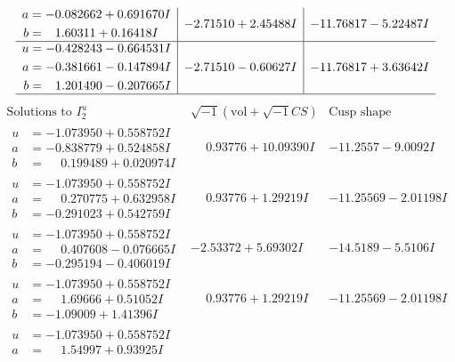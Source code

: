 \documentclass[1p]{elsarticle_modified}
\theoremstyle{definition}
\newcommand{\I}{\sqrt{-1}}
\begin{document}
$$\begin{array}{c|c|c}
\begin{aligned}
a &= -0.082662 + 0.691670 I \\
b &= \phantom{-}1.60311 + 0.16418 I\end{aligned}
 & -2.71510 + 2.45488 I & -11.76817 - 5.22487 I \\ \hline\begin{aligned}
u &= -0.428243 - 0.664531 I \\
a &= -0.381661 - 0.147894 I \\
b &= \phantom{-}1.201490 - 0.207665 I\end{aligned}
 & -2.71510 - 0.60627 I & -11.76817 + 3.63642 I\\
 \hline 
 \end{array}$$\newpage$$\begin{array}{c|c|c}  
\text{Solutions to }I^u_{2}& \I (\text{vol} + \sqrt{-1}CS) & \text{Cusp shape}\\
 \hline 
\begin{aligned}
u &= -1.073950 + 0.558752 I \\
a &= -0.838779 + 0.524858 I \\
b &= \phantom{-}0.199489 + 0.020974 I\end{aligned}
 & \phantom{-}0.93776 + 10.09390 I & -11.2557 - 9.0092 I \\ \hline\begin{aligned}
u &= -1.073950 + 0.558752 I \\
a &= \phantom{-}0.270775 + 0.632958 I \\
b &= -0.291023 + 0.542759 I\end{aligned}
 & \phantom{-}0.93776 + 1.29219 I & -11.25569 - 2.01198 I \\ \hline\begin{aligned}
u &= -1.073950 + 0.558752 I \\
a &= \phantom{-}0.407608 - 0.076665 I \\
b &= -0.295194 - 0.406019 I\end{aligned}
 & -2.53372 + 5.69302 I & -14.5189 - 5.5106 I \\ \hline\begin{aligned}
u &= -1.073950 + 0.558752 I \\
a &= \phantom{-}1.69666 + 0.51052 I \\
b &= -1.09009 + 1.41396 I\end{aligned}
 & \phantom{-}0.93776 + 1.29219 I & -11.25569 - 2.01198 I \\ \hline\begin{aligned}
u &= -1.073950 + 0.558752 I \\
a &= \phantom{-}1.54997 + 0.93925 I \\

\end{aligned}
\end{array}$$
\end{document}
